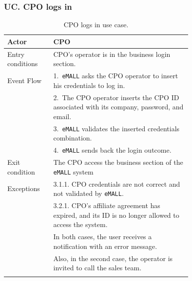 \subsubsection*{UC\cuc . CPO logs in}
\begin{center}
    \begin{longtable}{lp{0.75\linewidth}}
        \hline
        Actor            & CPO                                                                                                 \\
        \hline
        Entry conditions & CPO’s operator is in the business login section.                                                    \\
        \hline
        Event Flow       & 1.\ \verb|eMALL| asks the CPO operator to insert his credentials to log in.                                \\
        & 2.\ The CPO operator inserts the CPO ID associated with its company, password, and email.           \\
        & 3.\ \verb|eMALL| validates the inserted credentials combination.                                           \\
        & 4.\ \verb|eMALL| sends back the login outcome.                                                             \\
        \hline
        Exit condition   & The CPO access the business section of the \verb|eMALL| system                                             \\
        \hline
        Exceptions       & 3.1.1. CPO credentials are not correct and not validated by \verb|eMALL|.                                  \\
        & 3.2.1. CPO’s affiliate agreement has expired, and its ID is no longer allowed to access the system. \\
        & In both cases, the user receives a notification with an error message.                              \\
        & Also, in the second case, the operator is invited to call the sales team.                           \\
        \hline
        \caption{CPO logs in use case.}
        \label{tab: CPO_logs_in_use_case}
    \end{longtable}


\end{center}
